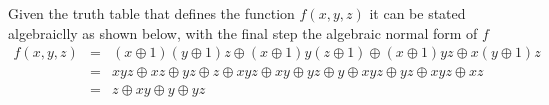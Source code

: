 Given the truth table that defines the function $f(x,y,z)$ it can be stated
algebraiclly as shown below, with the final step the algebraic normal form
of $f$
\begin{eqnarray*}
    f(x,y,z) &=& (x \oplus 1)(y \oplus 1)z \oplus
                (x \oplus 1)y(z \oplus 1) \oplus
                (x \oplus 1)yz \oplus
                x(y \oplus 1)z \\
    &=& xyz \oplus xz \oplus yz \oplus z \oplus
                xyz \oplus xy \oplus yz \oplus y \oplus
                xyz \oplus yz \oplus
                xyz \oplus xz\\
    &=& z \oplus xy \oplus y \oplus yz
\end{eqnarray*}